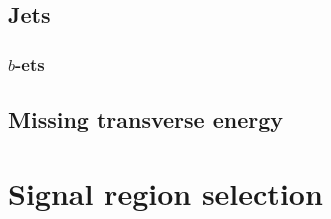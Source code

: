 
\subsection{Jets}
\label{subsec:event_jets}


\subsubsection{$b$-ets}
\label{subsubsec:event_bjets}


\subsection{Missing transverse energy}
\label{subsec:event_met}


\section{Signal region selection}
\label{sec:event_signal_region_selection}
